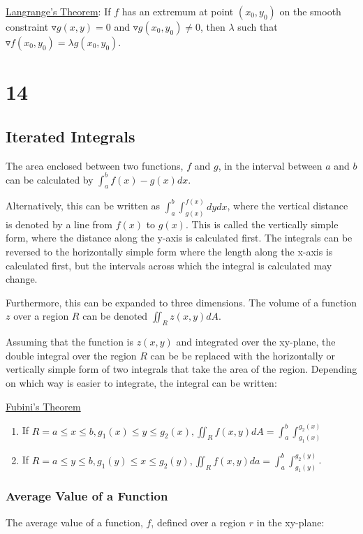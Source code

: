 \documentclass [12 pt, oneside] {book}
\begin{document}
\underline{Langrange's Theorem}: If $f$ has an extremum at point $(x_0,y_0)$ on the smooth constraint $\triangledown g(x,y)=0$ and $\triangledown g(x_0,y_0)\neq 0$, then $\lambda$ such that $\triangledown f(x_0,y_0)=\lambda g(x_0,y_0)$.

\chapter{14}
\section{Iterated Integrals}

The area enclosed between two functions, $f$ and $g$, in the interval between $a$ and $b$ can be calculated by $\int_a^b f(x)-g(x) dx$. 

Alternatively, this can be written as $\int_a^b\int_{g(x)}^{f(x)}dydx$, where the vertical distance is denoted by a line from $f(x)$ to $g(x)$. This is called the vertically simple form, where the distance along the y-axis is calculated first. The integrals can be reversed to the horizontally simple form where the length along the x-axis is calculated first, but the intervals across which the integral is calculated may change.

Furthermore, this can be expanded to three dimensions. The volume of a function $z$ over a region $R$ can be denoted $\iint_R z(x,y) dA$.

Assuming that the function is $z(x,y)$ and integrated over the xy-plane, the double integral over the region $R$ can be be replaced with the horizontally or vertically simple form of two integrals that take the area of the region. Depending on which way is easier to integrate, the integral can be written:

\underline{Fubini's Theorem}
\begin{enumerate}
\item If $R={a\leq x\leq b, g_1(x)\leq y\leq g_2(x)}, \iint_R f(x,y)dA = \int_a^b\int_{g_1(x)}^{g_2(x)}$
\item If $R={a\leq y\leq b, g_1(y)\leq x\leq g_2(y)}, \iint_R f(x,y)da = \int_a^b\int_{g_1(y)}^{g_2(y)}$.
\end{enumerate}

\subsection{Average Value of a Function}
The average value of a function, $f$, defined over a region $r$ in the xy-plane:
\end{document}
